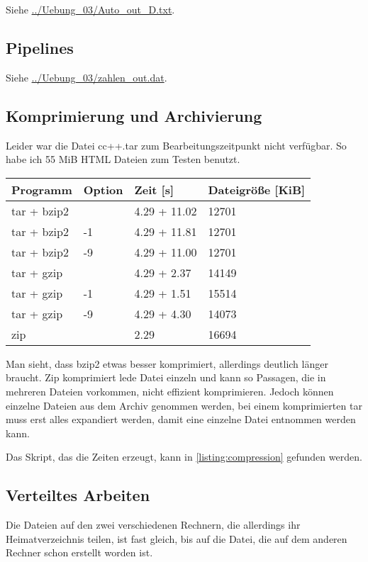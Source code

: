 \documentclass[10pt]{article}
\begin{document}
Siehe \url{../Uebung_03/Auto_out_D.txt}.

\subsection{Pipelines}

Siehe \url{../Uebung_03/zahlen_out.dat}.

\subsection{Komprimierung und Archivierung}

Leider war die Datei cc++.tar zum Bearbeitungszeitpunkt nicht verfügbar. So habe ich 55 MiB HTML Dateien zum Testen benutzt.

\begin{tabular}{llll}
Programm & Option & Zeit [s] & Dateigröße [KiB] \\
\hline
tar + bzip2 &  & 4.29 + 11.02 & 12701 \\
tar + bzip2 & -1 & 4.29 + 11.81 & 12701 \\
tar + bzip2 & -9 & 4.29 + 11.00 & 12701 \\
tar + gzip &  & 4.29 + 2.37 & 14149 \\
tar + gzip & -1 & 4.29 + 1.51 & 15514 \\
tar + gzip & -9 & 4.29 + 4.30 & 14073 \\
zip &  & 2.29 & 16694\\
\end{tabular}

Man sieht, dass bzip2 etwas besser komprimiert, allerdings deutlich länger braucht. Zip komprimiert lede Datei einzeln und kann so Passagen, die in mehreren Dateien vorkommen, nicht effizient komprimieren. Jedoch können einzelne Dateien aus dem Archiv genommen werden, bei einem komprimierten tar muss erst alles expandiert werden, damit eine einzelne Datei entnommen werden kann.

Das Skript, das die Zeiten erzeugt, kann in \ref{listing:compression} gefunden werden.


\subsection{Verteiltes Arbeiten}

Die Dateien auf den zwei verschiedenen Rechnern, die allerdings ihr Heimatverzeichnis teilen, ist fast gleich, bis auf die Datei, die auf dem anderen Rechner schon erstellt worden ist.
\end{document}
